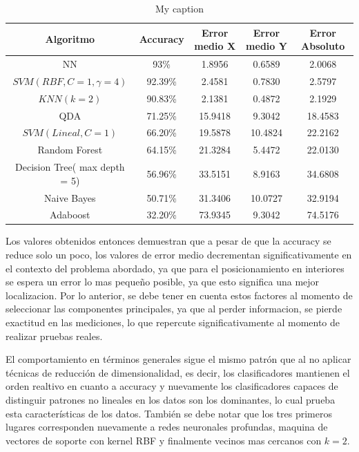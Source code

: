 \begin{table}[ht!]
\centering
\caption{My caption}
\label{tabla-pca}
\begin{tabular}{|c|c|c|c|c|}
\hline
Algoritmo                     & Accuracy & Error medio X & Error medio Y & Error Absoluto \\ \hline
NN                            & 93\%  & 1.8956        & 0.6589        & 2.0068         \\ \hline
$SVM(RBF, C=1, \gamma = 4)$   & 92.39\%  & 2.4581  & 0.7830        & 2.5797         \\ \hline
$KNN(k = 2)$                  & 90.83\%  & 2.1381 & 0.4872        & 2.1929         \\ \hline
QDA                           & 71.25\%  & 15.9418 & 9.3042        & 18.4583         \\ \hline
$SVM(Lineal, C=1)$            & 66.20\%  & 19.5878 & 10.4824        & 22.2162        \\ \hline
Random Forest                 & 64.15\%  & 21.3284 & 5.4472        & 22.0130       \\ \hline
Decision Tree( max depth = 5) & 56.96\%  & 33.5151       & 8.9163       & 34.6808        \\ \hline
Naive Bayes                   & 50.71\%  & 31.3406 & 10.0727        & 32.9194        \\ \hline
Adaboost                      & 32.20\%  & 73.9345 & 9.3042       & 74.5176       \\ \hline
\end{tabular}
\end{table}

Los valores obtenidos entonces demuestran que a pesar de que la accuracy se reduce solo un poco, los valores de error medio decrementan significativamente en el contexto del problema abordado, ya que para el posicionamiento en interiores se espera un error lo mas pequeño posible, ya que esto significa una mejor localizacion. Por lo anterior, se debe tener en cuenta estos factores al momento de seleccionar las componentes principales, ya que al perder informacion, se pierde exactitud en las mediciones, lo que repercute significativamente al momento de realizar pruebas reales. 

El comportamiento en términos generales sigue el mismo patrón que al no aplicar técnicas de reducción de dimensionalidad, es decir, los clasificadores mantienen el orden realtivo en cuanto a accuracy y nuevamente los clasificadores capaces de distinguir patrones no lineales en los datos son los dominantes, lo cual prueba esta características de los datos. También se debe notar que los tres primeros lugares corresponden nuevamente a redes neuronales profundas, maquina de vectores de soporte con kernel RBF y finalmente vecinos mas cercanos con $k=2$. 

